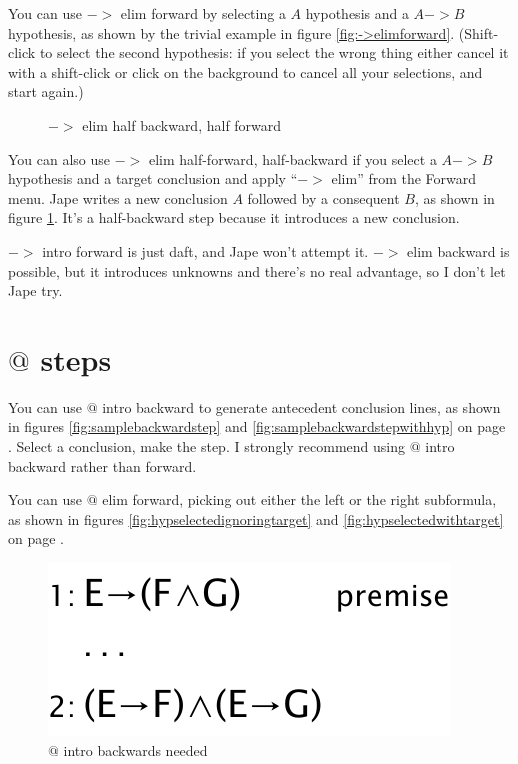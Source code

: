 \documentclass[11pt]{book}
\newcommand{\figref}[1]{figure \ref{fig:#1}}
\begin{document}
You can use $->$ elim forward by selecting a $A$ hypothesis and a $A->B$ hypothesis, as shown by the trivial example in \figref{->elimforward}. (Shift-click to select the second hypothesis: if you select the wrong thing either cancel it with a shift-click or click on the background to cancel all your selections, and start again.)

\begin{figure}
\centering
{}
\qquad
{}
\caption{$->$ elim half backward, half forward}
\label{fig:->elimhalfbackward}
\end{figure}

You can also use $->$ elim half-forward, half-backward if you select a $A->B$ hypothesis and a target conclusion and apply ``$->$ elim'' from the Forward menu. Jape writes a new conclusion $A$ followed by a consequent $B$, as shown in \figref{->elimhalfbackward}. It's a half-backward step because it introduces a new conclusion.

$->$ intro forward is just daft, and Jape won't attempt it. $->$ elim backward is possible, but it introduces unknowns and there's no real advantage, so I don't let Jape try.
 
\section{$@$ steps}

You can use $@$ intro backward to generate antecedent conclusion lines, as shown in figures \ref{fig:samplebackwardstep} and \ref{fig:samplebackwardstepwithhyp} on page \pageref{fig:samplebackwardstep}. Select a conclusion, make the step. I strongly recommend using $@$ intro backward rather than forward.

You can use $@$ elim forward, picking out either the left or the right subformula, as shown in figures \ref{fig:hypselectedignoringtarget} and \ref{fig:hypselectedwithtarget} on page \pageref{fig:hypselectedignoringtarget}.

\begin{figure}
\centering
\includegraphics[scale=0.5]{pics/@introbackwardsworks}
\caption{$@$ intro backwards needed}
\label{fig:@introbackwardsworks}
\end{figure}
\end{document}
